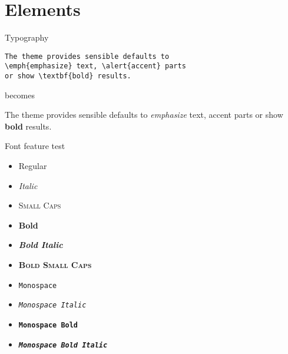 \documentclass[10pt]{beamer}
\begin{document}
\section{Elements}

\begin{frame}[fragile]{Typography}
    \begin{verbatim}The theme provides sensible defaults to
\emph{emphasize} text, \alert{accent} parts
or show \textbf{bold} results.\end{verbatim}

    \begin{center}becomes\end{center}

    The theme provides sensible defaults to \emph{emphasize} text,
    \alert{accent} parts or show \textbf{bold} results.
\end{frame}

\begin{frame}{Font feature test}
    \begin{itemize}
        \item Regular
        \item \textit{Italic}
        \item \textsc{Small Caps}
        \item \textbf{Bold}
        \item \textbf{\textit{Bold Italic}}
        \item \textbf{\textsc{Bold Small Caps}}
        \item \texttt{Monospace}
        \item \texttt{\textit{Monospace Italic}}
        \item \texttt{\textbf{Monospace Bold}}
        \item \texttt{\textbf{\textit{Monospace Bold Italic}}}
    \end{itemize}
\end{frame}
\end{document}
